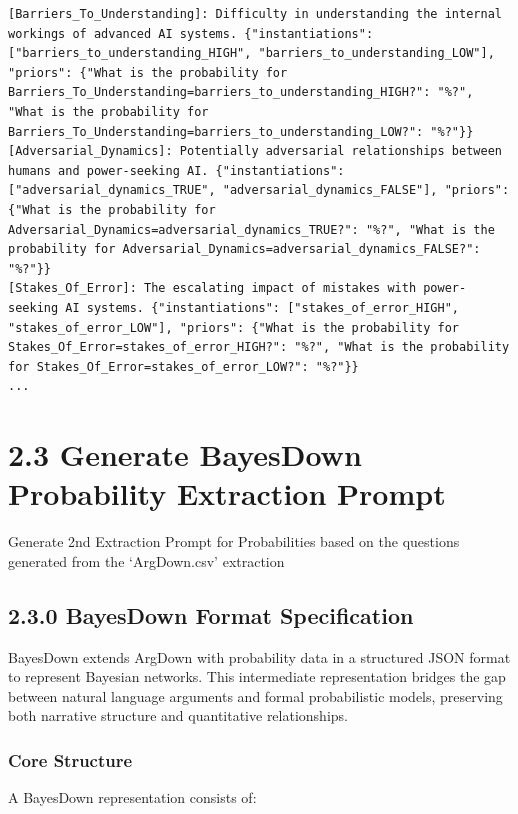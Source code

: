 \documentclass[
  11pt,
  letterpaper,
]{book}
\begin{document}
\begin{verbatim}
[Barriers_To_Understanding]: Difficulty in understanding the internal workings of advanced AI systems. {"instantiations": ["barriers_to_understanding_HIGH", "barriers_to_understanding_LOW"], "priors": {"What is the probability for Barriers_To_Understanding=barriers_to_understanding_HIGH?": "%?", "What is the probability for Barriers_To_Understanding=barriers_to_understanding_LOW?": "%?"}}
[Adversarial_Dynamics]: Potentially adversarial relationships between humans and power-seeking AI. {"instantiations": ["adversarial_dynamics_TRUE", "adversarial_dynamics_FALSE"], "priors": {"What is the probability for Adversarial_Dynamics=adversarial_dynamics_TRUE?": "%?", "What is the probability for Adversarial_Dynamics=adversarial_dynamics_FALSE?": "%?"}}
[Stakes_Of_Error]: The escalating impact of mistakes with power-seeking AI systems. {"instantiations": ["stakes_of_error_HIGH", "stakes_of_error_LOW"], "priors": {"What is the probability for Stakes_Of_Error=stakes_of_error_HIGH?": "%?", "What is the probability for Stakes_Of_Error=stakes_of_error_LOW?": "%?"}}
...
\end{verbatim}

\section{2.3 Generate BayesDown Probability Extraction
Prompt}\label{generate-bayesdown-probability-extraction-prompt}

Generate 2nd Extraction Prompt for Probabilities based on the questions
generated from the `ArgDown.csv' extraction

\subsection{2.3.0 BayesDown Format
Specification}\label{bayesdown-format-specification}

BayesDown extends ArgDown with probability data in a structured JSON
format to represent Bayesian networks. This intermediate representation
bridges the gap between natural language arguments and formal
probabilistic models, preserving both narrative structure and
quantitative relationships.

\subsubsection{Core Structure}\label{core-structure}

A BayesDown representation consists of:
\end{document}
